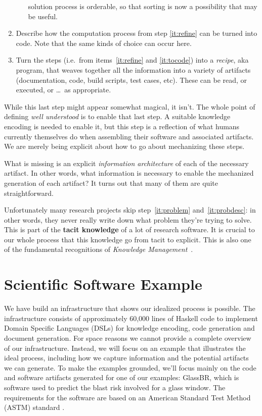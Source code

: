 \documentclass[sigconf,review]{acmart}
\begin{document}
\begin{enumerate}
\begin{enumerate}
  solution process is orderable, so that sorting is now a possibility that
  may be useful.
  \end{enumerate}
\item\label{it:tocode} Describe how the computation process from step
\ref{it:refine} can be turned into code. Note that the same kinds of choice
can occur here.
\item\label{it:recipe} Turn the steps (i.e.\ from items~\ref{it:refine} and
\ref{it:tocode}) into a \emph{recipe}, aka program, that weaves together all the
information into a variety of artifacts (documentation, code, build scripts,
test cases, etc). These can be read, or executed, or \ldots\, as appropriate.
\end{enumerate}

While this last step might appear somewhat magical, it isn't. The whole point of
defining \emph{well understood} is to enable that last step. A suitable
knowledge encoding is needed to enable it, but this step is a reflection of what
humans currently themselves do when assembling their software and associated
artifacts. We are merely being explicit about how to go about mechanizing these
steps.

What is missing is an explicit \emph{information architecture} of each of
the necessary artifact. In other words, what information is necessary to
enable the mechanized generation of each artifact? It turns out that many
of them are quite straightforward.

Unfortunately many research projects skip step~\ref{it:problem}
and~\ref{it:probdesc}: in other words, they never really write down what problem
they're trying to solve. This is part of the \textbf{tacit knowledge} of a lot
of research software.  It is crucial to our whole process that this knowledge go
from tacit to explicit. This is also one of the fundamental recognitions of
\emph{Knowledge Management}~\cite{KM-textbook}.


\section{Scientific Software Example}\label{ch:example}

We have build an infrastructure that shows our idealized process is possible.
The infrastructure consists of approximately 60,000 lines of Haskell code to
implement Domain Specific Languages (DSLs) for knowledge encoding, code
generation and document generation.  For space reasons we cannot provide a
complete overview of our infrastructure.
Instead, we will focus on an example that illustrates the ideal process,
including how we capture information and the potential artifacts we can
generate.  To make the examples grounded, we'll focus mainly on the code and
software artifacts generated for one of our examples: GlassBR, which is software
used to predict the blast risk involved for a glass window.  The requirements
for the software are based on an American Standard Test Method (ASTM) standard
\cite{BeasonEtAl1998}.
\end{document}
